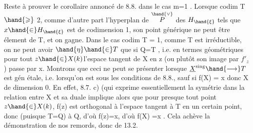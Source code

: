 Reste à prouver le corollaire annoncé de 8.8. dans le cas m=1 .
Lorsque  codim T $\hand{\geqslant}$ 2, comme d'autre part l'hyperplan  de $\overset{\hand{\vee}}{P}$ des
$H_{\hand{\xi}}$ tels que $x\hand{\in} H_{\hand{\xi}}$ est de codimension 1, son point générique  ne peut
être élement de T, et on gagne. Dans le cas codim T = 1, comme T est
irréductible, on ne peut avoir $\hand{\eta}\hand{\in} T$ que si Q=T ,
i.e. en termes géométriques   pour tout $z\hand{\in} X(k)$l'espace tangent
de X en z (ou plutôt son image par $f'_{z}$ ) passe par x. Montrons que
ceci ne peut se présenter lorsque $\underline{X}^{\mathrm{sing}}\hand{\longrightarrow}T$ est gén étale, i.e.
lorsqu'on est sous les conditions de 8.8., sauf si f(X) = \hand{\{}x\hand{\}} donc X
de dimension 0. En effet, 8.7. c) (qui exprime essentiellement la
symétrie  dans la relation entre X et sa duale \hand{)} implique alors que
pour presque tout point $z\hand{\in} X(k)$, f(z) est orthogonal à l'espace tangent
à T en un certain point, donc (puisque T=Q)  à Q, d'où f(z)=x, d'où
f(X) =\hand{\{}x\hand{\}} . Cela achève la démonstration de nos remords, donc de 13.2.

